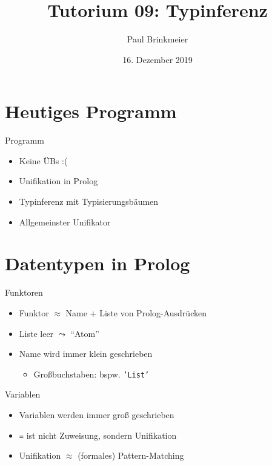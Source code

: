 \documentclass{beamer}
\title{Tutorium 09: Typinferenz}
\author{Paul Brinkmeier}
\institute{Tutorium Programmierparadigmen am KIT}
\date{16. Dezember 2019}
\newcommand{\code}[1]{
	\begin{mdframed}
		
	\end{mdframed}
}
\begin{document}
\begin{frame}
	\titlepage
\end{frame}

\section{Heutiges Programm}

\begin{frame}{Programm}
	\begin{itemize}
		\item Keine ÜBs :(
		\item Unifikation in Prolog
		\item Typinferenz mit Typisierungsbäumen
		\item Allgemeinster Unifikator
	\end{itemize}
\end{frame}

\section{Datentypen in Prolog}

\begin{frame}{Funktoren}
	\code{demos/funktoren.pl}

	\begin{itemize}
		\item Funktor $\approx$ Name + Liste von Prolog-Ausdrücken
		\item Liste leer $\leadsto$ \enquote{Atom}
		\item Name wird immer klein geschrieben
		\begin{itemize}
			\item Großbuchstaben: bspw. \texttt{'List'}
		\end{itemize}
	\end{itemize}
\end{frame}

\begin{frame}{Variablen}
	\code{demos/variablen.pl}

	\begin{itemize}
		\item Variablen werden immer groß geschrieben
		\item \texttt{=} ist nicht Zuweisung, sondern Unifikation
		\item Unifikation $\approx$ (formales) Pattern-Matching
	\end{itemize}
\end{frame}
\end{document}
